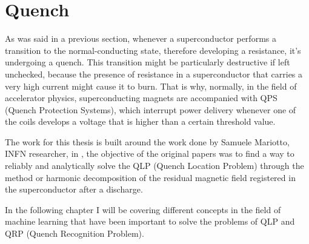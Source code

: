 \section{Quench}
As was said in a previous section, whenever a superconductor performs a transition to the
normal-conducting state, therefore developing a resistance, it's undergoing a quench. This
transition might be particularly destructive if left unchecked, because the presence of resistance
in a superconductor that carries a very high current might cause it to burn. That is why, normally,
in the field of accelerator physics, superconducting magnets are accompanied with QPS (Quench
Protection Systems), which interrupt power delivery whenever one of the coils develops a voltage
that is higher than a certain threshold value.

The work for this thesis is built around the work done by Samuele Mariotto, INFN researcher, in
\cite{mariotto2022} \cite{mariotto2022-generic}, the objective of the original papers was to find a
way to reliably and analytically solve the QLP (Quench Location Problem) through the method or
harmonic decomposition of the residual magnetic field registered in the superconductor after a
discharge.

In the following chapter I will be covering different concepts in the field of machine learning that
have been important to solve the problems of QLP and QRP (Quench Recognition Problem).
